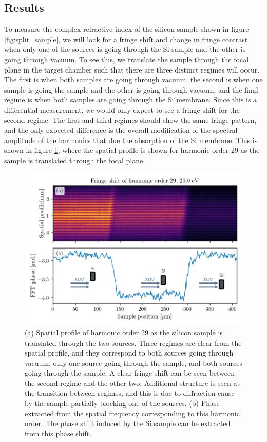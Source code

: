 \subsection{Results}
To measure the complex refractive index of the silicon sample shown in figure \ref{fig:split_sample}, we will look for a fringe shift and change in fringe contrast when only one of the sources is going through the Si sample and the other is going through vacuum.  To see this, we translate the sample through the focal plane in the target chamber such that there are three distinct regimes will occur.  The first is when both samples are going through vacuum, the second is when one sample is going the sample and the other is going through vacuum, and the final regime is when both samples are going through the Si membrane.  Since this is a differential measurement, we would only expect to see a fringe shift for the second regime.  The first and third regimes should show the same fringe pattern, and the only expected difference is the overall modification of the spectral amplitude of the harmonics that due the absorption of the Si membrane.  This is shown in figure \ref{fig:harmonic_phase_shift}, where the spatial profile is shown for harmonic order 29 as the sample is translated through the focal plane.  
\begin{figure}
	\centering
	\includegraphics[width=1.0\textwidth]{figures/refractive_index/harmonic_phase_shift.png}
	\caption{(a) Spatial profile of harmonic order 29 as the silicon sample is translated through the two sources. Three regimes are clear from the spatial profile, and they correspond to both sources going through vacuum, only one source going through the sample, and both sources going through the sample.  A clear fringe shift can be seen between the second regime and the other two.  Additional structure is seen at the transition between regimes, and this is due to diffraction cause by the sample partially blocking one of the sources. (b) Phase extracted from the spatial frequency corresponding to this harmonic order.  The phase shift induced by the Si sample can be extracted from this phase shift.}
	\label{fig:harmonic_phase_shift}
\end{figure}

